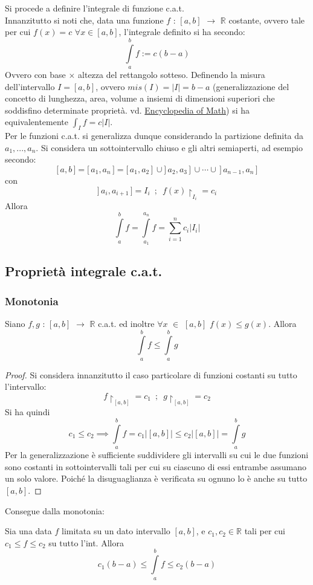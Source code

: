 \documentclass[10pt, oneside]{book}
\theoremstyle{plain}
\begin{document}
Si procede a definire l'integrale di funzione c.a.t.
\\Innanzitutto si noti che, data una funzione $f$ : $[a,b]$ $\rightarrow$ $\mathbb{R}$ costante, ovvero tale per cui $f(x) = c$ $\forall x \in [a,b]$, l'integrale definito si ha secondo:
\[\int \limits_a^b f := c (b - a)\]
Ovvero con base $\times$ altezza del rettangolo sotteso. Definendo la misura dell'intervallo $I = [a,b]$, ovvero $mis(I) = \big|I\big| = b - a$ (generalizzazione del concetto di lunghezza, area, volume a insiemi di dimensioni superiori che soddisfino determinate proprietà. vd. \href{https://encyclopediaofmath.org/wiki/Measure#Jordan.2C_Lebesgue_and_Lebesgue.E2.80.93Stieltjes_measures.}{Encyclopedia of Math}) si ha equivalentemente $\int_I f = c \big|I\big|$.
\\Per le funzioni c.a.t. si generalizza dunque considerando la partizione definita da $a_1, ..., a_n$. Si considera un sottointervallo chiuso e gli altri semiaperti, ad esempio secondo:
\[\big[ \, a, b\, \big] = \big[ \, a_1, a_n \,\big] = \big[ \, a_1, a_2 \, \big] \, \cup \big] \, a_2, a_3 \, \big] \, \cup \cdots \cup \, \big] \, a_{n-1}, a_n \, \big]\]
con 
\[ \big] \, a_i, a_{i+1}\, \big] = I_i \enspace; \enspace f(x)\restriction_{I_i} = c_i\]
Allora
\[\int\limits_{a}^{b} f = \int \limits_{a_1}^{a_n} f = \sum \limits_{i = 1}^n c_i \big|I_i\big|\]

\subsection{Proprietà integrale c.a.t.}
\subsubsection{Monotonia}
Siano $f,g$ : $[a,b]$ $\rightarrow$ $\mathbb{R}$ c.a.t. ed inoltre $\forall x$ $\in$ $[a,b]$ $f(x) \leq g(x)$. Allora
\[\int\limits_{a}^{b} f \leq \int\limits_{a}^{b} g\]
\begin{proof}
    Si considera innanzitutto il caso particolare di funzioni costanti su tutto l'intervallo:
    \[f \restriction_{[a,b]} = c_1 \enspace ; \enspace g \restriction_{[a,b]} = c_2\]
    Si ha quindi
    \[c_1 \leq c_2 \implies \int\limits_{a}^{b} f = c_1 \big|[a,b]\big| \leq c_2 \big|[a,b]\big| = \int\limits_{a}^{b} g\]
    Per la generalizzazione è sufficiente suddividere gli intervalli su cui le due funzioni sono costanti in sottointervalli tali per cui su ciascuno di essi entrambe assumano un solo valore. Poiché la disuguaglianza è verificata su ognuno lo è anche su tutto $[a,b]$.
\end{proof}
Consegue dalla monotonia:
\begin{oss}
    Sia una data $f$ limitata su un dato intervallo $[a,b]$, e $c_1, c_2 \in \mathbb{R}$ tali per cui $c_1 \leq f \leq c_2$ su tutto l'int. Allora
    \[c_1(b - a) \leq \int\limits_{a}^{b} f \leq c_2(b-a)\]
\end{oss}
\end{document}
